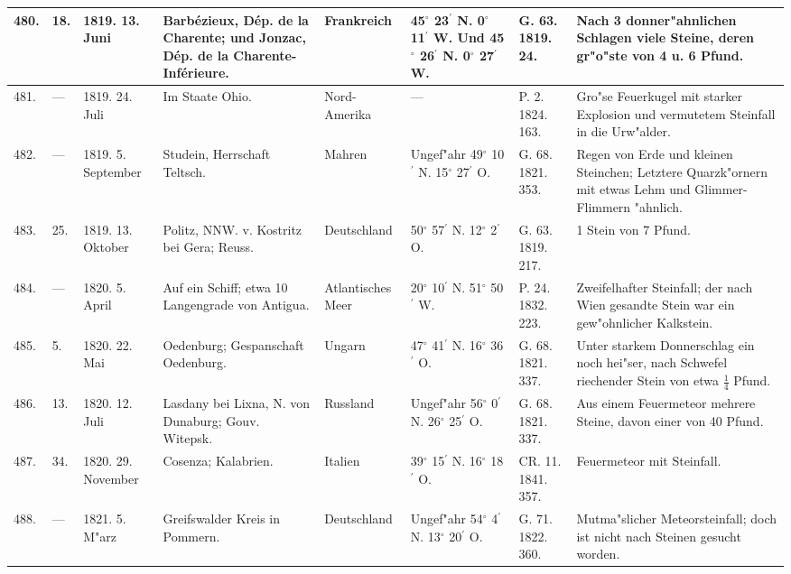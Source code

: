 \documentclass[a4paper, 8pt, oneside, polutonikogreek, german]{article}
\begin{document}
\begin{center}
\begin{longtable}{| p{4mm} | p{2mm} | p{15mm} | p{25mm} | p{16mm} | p{12mm} | p{13mm} | p{20mm} |}
        480. & 18. & 1819. 13. Juni & Barbézieux, Dép. de la Charente; und Jonzac, Dép. de la Charente-Inférieure. & Frankreich & 45$^\circ$ 23$^\prime$ N. 0$^\circ$ 11$^\prime$ W. Und 45$^\circ$ 26$^\prime$ N. 0$^\circ$ 27$^\prime$ W. & G. 63. 1819. 24. & Nach 3 donner"ahnlichen Schlagen viele Steine, deren gr"o"ste von 4 u. 6 Pfund. \\ \hline
        481. & --- & 1819. 24. Juli & Im Staate Ohio. & Nord-Amerika & --- & P. 2. 1824. 163. & Gro"se Feuerkugel mit starker Explosion und vermutetem Steinfall in die Urw"alder. \\ \hline
        482. & --- & 1819. 5. September & Studein, Herrschaft Teltsch. & Mahren & Ungef"ahr 49$^\circ$ 10$^\prime$ N. 15$^\circ$ 27$^\prime$ O. & G. 68. 1821. 353. & Regen von Erde und kleinen Steinchen; Letztere Quarzk"ornern mit etwas Lehm und Glimmer-Flimmern "ahnlich. \\ \hline
        483. & 25. & 1819. 13. Oktober & Politz, NNW. v. Kostritz bei Gera; Reuss. & Deutschland & 50$^\circ$ 57$^\prime$ N. 12$^\circ$ 2$^\prime$ O. & G. 63. 1819. 217. & 1 Stein von 7 Pfund. \\ \hline
        484. & --- & 1820. 5. April & Auf ein Schiff; etwa 10 Langengrade von Antigua. & Atlantisches Meer & 20$^\circ$ 10$^\prime$ N. 51$^\circ$ 50$^\prime$ W. & P. 24. 1832. 223. & Zweifelhafter Steinfall; der nach Wien gesandte Stein war ein gew"ohnlicher Kalkstein. \\ \hline
        485. & 5. & 1820. 22. Mai & Oedenburg; Gespanschaft Oedenburg. & Ungarn & 47$^\circ$ 41$^\prime$ N. 16$^\circ$ 36$^\prime$ O. & G. 68. 1821. 337. & Unter starkem Donnerschlag ein noch hei"ser, nach Schwefel riechender Stein von etwa $\frac{1}{4}$ Pfund. \\ \hline
        486. & 13. & 1820. 12. Juli & Lasdany bei Lixna, N. von Dunaburg; Gouv. Witepsk. & Russland & Ungef"ahr 56$^\circ$ 0$^\prime$ N. 26$^\circ$ 25$^\prime$ O. & G. 68. 1821. 337. & Aus einem Feuermeteor mehrere Steine, davon einer von 40 Pfund. \\ \hline
        487. & 34. & 1820. 29. November & Cosenza; Kalabrien. & Italien & 39$^\circ$ 15$^\prime$ N. 16$^\circ$ 18$^\prime$ O. & CR. 11. 1841. 357. & Feuermeteor mit Steinfall. \\ \hline
        488. & --- & 1821. 5. M"arz & Greifswalder Kreis in Pommern. & Deutschland & Ungef"ahr 54$^\circ$ 4$^\prime$ N. 13$^\circ$ 20$^\prime$ O. & G. 71. 1822. 360. & Mutma"slicher Meteorsteinfall; doch ist nicht nach Steinen gesucht worden. \\ \hline

\end{longtable}
\end{center}
\end{document}
